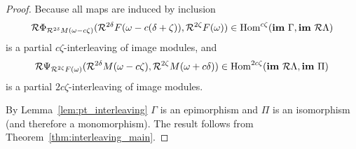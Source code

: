 \begin{proof}
  Because all maps are induced by inclusion
  \[ \mathcal{R}\Phi_{\mathcal{R}^{2\delta} M(\omega-c\zeta)}(\mathcal{R}^{2\delta} F(\omega-c(\delta+\zeta)), \mathcal{R}^{2\zeta} F(\omega))\in\mathrm{Hom}^{c\zeta}(\mathbf{im}~\Gamma, \mathbf{im}~\mathcal{R}\Lambda) \]
  is a partial $c\zeta$-interleaving of image modules, and
  \[ \mathcal{R}\Psi_{\mathcal{R}^{2\zeta} F(\omega)}(\mathcal{R}^{2\delta} M(\omega-c\zeta), \mathcal{R}^{2\zeta} M(\omega+c\delta))\in\mathrm{Hom}^{2c\zeta}(\mathbf{im}~\mathcal{R}\Lambda, \mathbf{im}~\Pi) \]
  is a partial $2c\zeta$-interleaving of image modules.

  By Lemma~\ref{lem:pt_interleaving} $\Gamma$ is an epimorphism and $\Pi$ is an isomorphism (and therefore a monomorphism).
  The result follows from Theorem~\ref{thm:interleaving_main}.



\end{proof}


